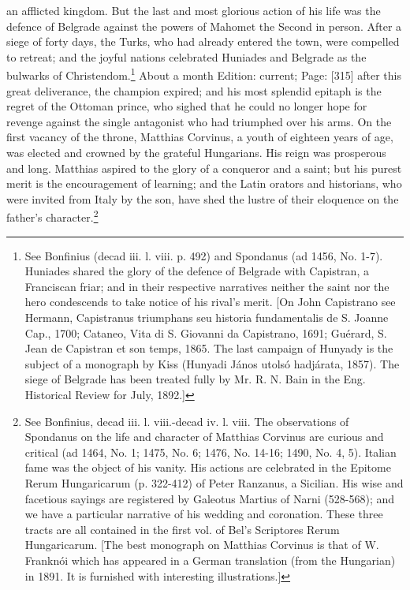 an afflicted kingdom. But the last and most glorious action of his life was the defence of Belgrade against the powers of Mahomet the Second in person. After a siege of forty days, the Turks, who had already entered the town, were compelled to retreat; and the joyful nations celebrated Huniades and Belgrade as the bulwarks of Christendom.\footnote{See Bonfinius (decad iii. l. viii. p. 492) and Spondanus (ad 1456, No. 1-7). Huniades shared the glory of the defence of Belgrade with Capistran, a Franciscan friar; and in their respective narratives neither the saint nor the hero condescends to take notice of his rival\texthebrew{}’s merit. [On John Capistrano see Hermann, Capistranus triumphans seu historia fundamentalis de S. Joanne Cap., 1700; Cataneo, Vita di S. Giovanni da Capistrano, 1691; Guérard, S. Jean de Capistran et son temps, 1865. The last campaign of Hunyady is the subject of a monograph by Kiss (Hunyadi János utolsó hadjárata, 1857). The siege of Belgrade has been treated fully by Mr. R. N. Bain in the Eng. Historical Review for July, 1892.]} About a month Edition: current; Page: [315] after this great deliverance, the champion expired; and his most splendid epitaph is the regret of the Ottoman prince, who sighed that he could no longer hope for revenge against the single antagonist who had triumphed over his arms. On the first vacancy of the throne, Matthias Corvinus, a youth of eighteen years of age, was elected and crowned by the grateful Hungarians. His reign was prosperous and long. Matthias aspired to the glory of a conqueror and a saint; but his purest merit is the encouragement of learning; and the Latin orators and historians, who were invited from Italy by the son, have shed the lustre of their eloquence on the father\texthebrew{}’s character.\footnote{See Bonfinius, decad iii. l. viii.-decad iv. l. viii. The observations of Spondanus on the life and character of Matthias Corvinus are curious and critical (ad 1464, No. 1; 1475, No. 6; 1476, No. 14-16; 1490, No. 4, 5). Italian fame was the object of his vanity. His actions are celebrated in the Epitome Rerum Hungaricarum (p. 322-412) of Peter Ranzanus, a Sicilian. His wise and facetious sayings are registered by Galeotus Martius of Narni (528-568); and we have a particular narrative of his wedding and coronation. These three tracts are all contained in the first vol. of Bel\texthebrew{}’s Scriptores Rerum Hungaricarum. [The best monograph on Matthias Corvinus is that of W. Franknói which has appeared in a German translation (from the Hungarian) in 1891. It is furnished with interesting illustrations.]}

